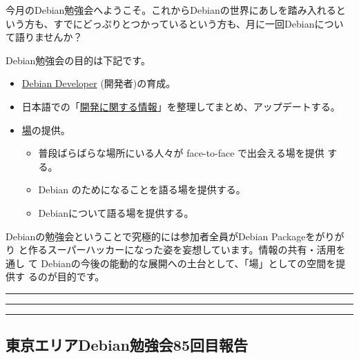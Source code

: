 \documentclass[mingoth,a4paper]{jsarticle}
\begin{document}
\begin{multicols}{2}
 

 今月のDebian勉強会へようこそ。これからDebianの世界にあしを踏み入れると
 いう方も、すでにどっぷりとつかっているという方も、月に一回Debianについ
 て語りませんか？

 Debian勉強会の目的は下記です。

 \begin{itemize}
 \item \underline{Debian Developer} (開発者)の育成。
 \item 日本語での「\underline{開発に関する情報}」を整理してまとめ、アップデートする。
 \item \underline{場}の提供。
 \begin{itemize}
  \item 普段ばらばらな場所にいる人々が face-to-face で出会える場を提供
	する。
  \item Debian のためになることを語る場を提供する。
  \item Debianについて語る場を提供する。
 \end{itemize}
 \end{itemize}		

 Debianの勉強会ということで究極的には参加者全員がDebian Packageをがりがり
 と作るスーパーハッカーになった姿を妄想しています。情報の共有・活用を通し
 て Debianの今後の能動的な展開への土台として、「場」としての空間を提供す
 るのが目的です。

\end{multicols}

\newpage

\begin{minipage}[b]{0.2\hsize}
 \colorbox{titleback}{}
\end{minipage}
\begin{minipage}[b]{0.8\hsize}
\hrule
\vspace{2mm}
\hrule
\begin{multicols}{2}
\tableofcontents
\end{multicols}
\vspace{2mm}
\hrule
\end{minipage}

\subsection{東京エリアDebian勉強会85回目報告}
\end{document}
